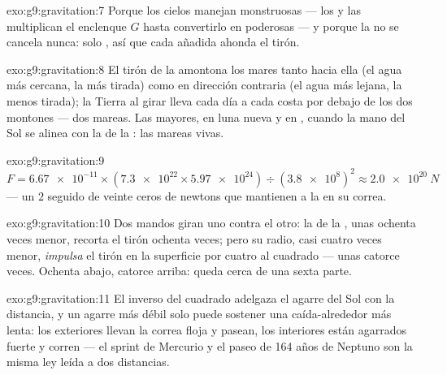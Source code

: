 \begin{solution}{exo:g9:gravitation:7}
Porque los cielos manejan  monstruosas --- los
 y las  multiplican el enclenque $G$ hasta
convertirlo en  poderosas --- y porque la
 no se cancela nunca: solo , así que
cada  añadida ahonda el tirón.
\end{solution}

\begin{solution}{exo:g9:gravitation:8}
El tirón de la  amontona los mares tanto hacia ella (el agua
más cercana, la más tirada) como en dirección contraria (el agua más
lejana, la menos tirada); la Tierra al girar lleva cada día a cada
costa por debajo de los dos montones --- dos mareas. Las mayores, en
luna nueva y en , cuando la mano del Sol se alinea con la
de la : las mareas vivas.
\end{solution}

\begin{solution}{exo:g9:gravitation:9}
$F = \num{6.67e-11} \times (\num{7.3e22} \times \num{5.97e24}) \div
(\num{3.8e8})^2 \approx \qty{2.0e20}{N}$ --- un $2$ seguido de veinte
ceros de newtons que mantienen a la  en su correa.
\end{solution}

\begin{solution}{exo:g9:gravitation:10}
Dos mandos giran uno contra el otro: la  de la
, unas ochenta veces menor, recorta el tirón ochenta veces;
pero su radio, casi cuatro veces menor, \emph{impulsa} el tirón en la
superficie por cuatro al cuadrado --- unas catorce veces. Ochenta
abajo, catorce arriba: queda cerca de una sexta parte.
\end{solution}

\begin{solution}{exo:g9:gravitation:11}
El inverso del cuadrado adelgaza el agarre del Sol con la distancia, y
un agarre más débil solo puede sostener una caída-alrededor más lenta:
los  exteriores llevan la correa floja y pasean, los
interiores están agarrados fuerte y corren --- el sprint de Mercurio y
el paseo de 164 años de Neptuno son la misma ley leída a dos
distancias.
\end{solution}

